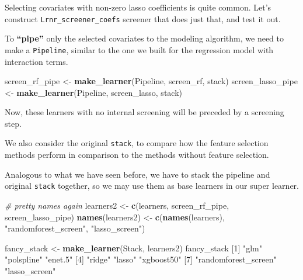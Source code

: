 \documentclass[12pt, krantz2,]{krantz}
\newenvironment{Shaded}{\begin{snugshade}}{\end{snugshade}}
\newcommand{\CommentTok}[1]{\textcolor[rgb]{0.37,0.37,0.37}{\textit{#1}}}
\newcommand{\DataTypeTok}[1]{\textcolor[rgb]{0.27,0.27,0.27}{#1}}
\newcommand{\DecValTok}[1]{\textcolor[rgb]{0.06,0.06,0.06}{#1}}
\newcommand{\KeywordTok}[1]{\textcolor[rgb]{0.27,0.27,0.27}{\textbf{#1}}}
\newcommand{\NormalTok}[1]{#1}
\newcommand{\OperatorTok}[1]{\textcolor[rgb]{0.43,0.43,0.43}{\textbf{#1}}}
\newcommand{\StringTok}[1]{\textcolor[rgb]{0.5,0.5,0.5}{#1}}
\theoremstyle{definition}
\theoremstyle{definition}
\theoremstyle{definition}
\newcommand{\1}{\mathbbm{1}}
\begin{document}
Selecting covariates with non-zero lasso coefficients is quite common. Let's
construct \texttt{Lrnr\_screener\_coefs} screener that does just that, and test it out.

\begin{Shaded}
\end{Shaded}

To \textbf{``pipe''} only the selected covariates to the modeling algorithm, we need to
make a \texttt{Pipeline}, similar to the one we built for the regression model with
interaction terms.

\begin{Shaded}
\begin{Highlighting}[]
\NormalTok{screen_rf_pipe <-}\StringTok{ }\KeywordTok{make_learner}\NormalTok{(Pipeline, screen_rf, stack)}
\NormalTok{screen_lasso_pipe <-}\StringTok{ }\KeywordTok{make_learner}\NormalTok{(Pipeline, screen_lasso, stack)}
\end{Highlighting}
\end{Shaded}

Now, these learners with no internal screening will be preceded by a screening
step.

We also consider the original \texttt{stack}, to compare how the feature selection
methods perform in comparison to the methods without feature selection.

Analogous to what we have seen before, we have to stack the pipeline and
original \texttt{stack} together, so we may use them as base learners in our super
learner.

\begin{Shaded}
\begin{Highlighting}[]
\CommentTok{# pretty names again}
\NormalTok{learners2 <-}\StringTok{ }\KeywordTok{c}\NormalTok{(learners, screen_rf_pipe, screen_lasso_pipe)}
\KeywordTok{names}\NormalTok{(learners2) <-}\StringTok{ }\KeywordTok{c}\NormalTok{(}\KeywordTok{names}\NormalTok{(learners), }\StringTok{"randomforest_screen"}\NormalTok{, }\StringTok{"lasso_screen"}\NormalTok{)}

\NormalTok{fancy_stack <-}\StringTok{ }\KeywordTok{make_learner}\NormalTok{(Stack, learners2)}
\NormalTok{fancy_stack}
\NormalTok{[}\DecValTok{1}\NormalTok{] }\StringTok{"glm"}                 \StringTok{"polspline"}           \StringTok{"enet.5"}             
\NormalTok{[}\DecValTok{4}\NormalTok{] }\StringTok{"ridge"}               \StringTok{"lasso"}               \StringTok{"xgboost50"}          
\NormalTok{[}\DecValTok{7}\NormalTok{] }\StringTok{"randomforest_screen"} \StringTok{"lasso_screen"}       
\end{Highlighting}
\end{Shaded}
\end{document}
